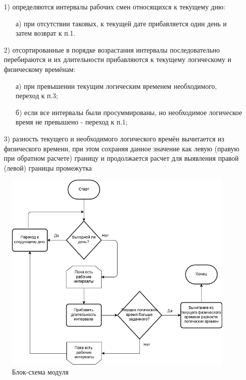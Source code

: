 \begin{enumerate}
	\item[1)] определяются интервалы рабочих смен относящихся к текущему дню:
	      \begin{enumerate}
		      \item[а)] при отсутствии таковых, к текущей дате прибавляется один день и затем возврат к п.1.
	      \end{enumerate}
	\item[2)] отсортированные в порядке возрастания интервалы последовательно перебираются и их длительности прибавляются к текущему логическому и физическому времёнам:
	      \begin{enumerate}
		      \item[а)] при превышении текущим логическим временем необходимого, переход к п.3;
		      \item[б)] если все интервалы были просуммированы, но необходимое логическое время не превышено - переход к п.1;
	      \end{enumerate}
	\item[3)] разность текущего и необходимого логического времён вычитается из физического времени, при этом сохраняя данное значение как левую (правую при обратном расчете) границу и продолжается расчет для выявления правой (левой) границы промежутка
\end{enumerate}

\begin{figure}[h]
	\includegraphics[width=\linewidth]{pics/scheduleSchema.png}
	\caption{Блок-схема модуля}
	\label{fig:schema}
	\centering
\end{figure}

